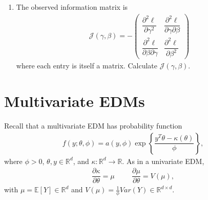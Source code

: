 \documentclass[11pt]{article}
\begin{document}
\begin{enumerate}
\begin{enumerate}
\item The observed information matrix is 
\renewcommand*{\arraystretch}{2}
\begin{align*}
\mathcal{J}(\gamma, \beta) = -\begin{pmatrix}
\dfrac{\partial^2 \ell}{\partial \gamma^2} & \dfrac{\partial^2 \ell}{\partial \gamma \partial \beta} \\[6pt]
\dfrac{\partial^2 \ell}{\partial \beta \partial \gamma} & \dfrac{\partial^2 \ell}{\partial \beta^2}
\end{pmatrix}
\end{align*}
where each entry is itself a matrix. Calculate $\mathcal{J}(\gamma, \beta)$.

\end{enumerate}
\end{enumerate}

\vspace{0.5cm}

\section*{Multivariate EDMs}

Recall that a multivariate EDM has probability function
\begin{align*}
f(y; \theta, \phi) = a(y, \phi) \exp \left\lbrace \dfrac{y^T \theta - \kappa(\theta)}{\phi} \right\rbrace,
\end{align*}
where $\phi > 0$, $\theta, y \in \mathbb{R}^d$, and $\kappa: \mathbb{R}^d \to \mathbb{R}$. As in a univariate EDM,
\begin{align*}
\dfrac{\partial \kappa}{\partial \theta} = \mu \hspace{1cm} \dfrac{\partial \mu}{\partial \theta} = V(\mu),
\end{align*}
with $\mu = \mathbb{E}[Y] \in \mathbb{R}^d$ and $V(\mu) = \frac{1}{\phi} Var(Y) \in \mathbb{R}^{d \times d}$.
\end{document}
